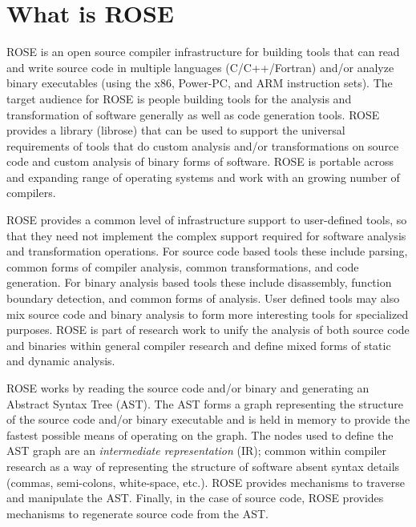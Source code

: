 \section{What is ROSE}

%
   ROSE is an open source compiler infrastructure for building tools that can
read and write source code in multiple languages (C/C++/Fortran) and/or analyze
binary executables (using the x86, Power-PC, and ARM instruction sets).
The target audience for ROSE is people building tools for the analysis
and transformation of software generally as well as code generation tools.
ROSE provides a library (librose) that can be 
used to support the universal requirements of tools that
do custom analysis and/or transformations on source code
and custom analysis of binary forms of software. ROSE is 
portable across and expanding range of operating systems
and work with an growing number of compilers.

   ROSE provides a common level of infrastructure support to
user-defined tools, so that they need not implement the 
complex support required for software analysis and transformation operations. 
For source code based tools these include parsing, common forms of 
compiler analysis, common transformations, and code generation.
For binary analysis based tools these include disassembly,
function boundary detection, and common forms of analysis.
User defined tools may also mix source code and binary analysis
to form more interesting tools for specialized purposes.
ROSE is part of research work to unify the analysis of
both source code and binaries within general compiler research
and define mixed forms of static and dynamic analysis.

   ROSE works by reading the source code and/or binary
and generating an Abstract Syntax Tree (AST).  The AST forms
a graph representing the structure of the source code and/or binary
executable and is held in memory to provide the fastest possible means 
of operating on the graph.  The nodes used to define the AST graph are 
an {\em intermediate representation} (IR); common within compiler research
as a way of representing the structure of software absent syntax details
(commas, semi-colons, white-space, etc.).  ROSE provides mechanisms to 
traverse and manipulate the AST. Finally, in the case of source code, 
ROSE provides mechanisms to regenerate source code from the AST.

